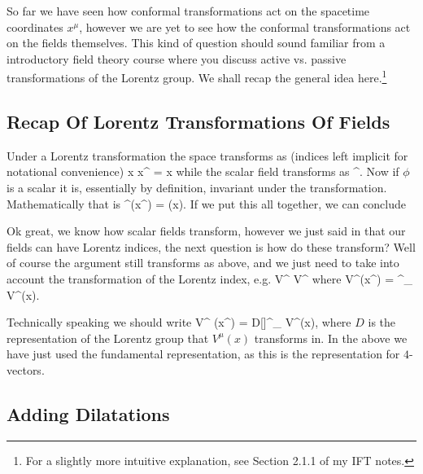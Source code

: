 So far we have seen how conformal transformations act on the spacetime coordinates $x^{\mu}$, however we are yet to see how the conformal transformations act on the fields themselves. This kind of question should sound familiar from a introductory field theory course where you discuss active vs. passive transformations of the Lorentz group. We shall recap the general idea here.\footnote{For a slightly more intuitive explanation, see Section 2.1.1 of my IFT notes.}

\subsection{Recap Of Lorentz Transformations Of Fields}

Under a Lorentz transformation the space transforms as (indices left implicit for notational convenience) 
\bse 
    x \to x^{\prime} = \Lambda x
\ese 
while the scalar field transforms as 
\bse 
    \phi \to \phi^{\prime}.
\ese 
Now if $\phi$ is a scalar it is, essentially by definition, invariant under the transformation. Mathematically that is
\bse 
    \phi^{\prime}(x^{\prime}) = \phi(x).
\ese 
If we put this all together, we can conclude

Ok great, we know how scalar fields transform, however we just said in  that our fields can have Lorentz indices, the next question is how do these transform? Well of course the argument still transforms as above, and we just need to take into account the transformation of the Lorentz index, e.g.
\bse 
    V^{\mu} \to V^{\prime\mu} 
\ese 
where 
\be 
\label{eqn:VmuTransform}
    V^{\prime\mu}(x^{\prime}) = {\Lambda^{\mu}}_{\nu} V^{\nu}(x).
\ee

\badr 
    Technically speaking we should write 
    \bse 
        V^{\prime \mu} (x^{\prime}) = {D[\Lambda]^{\mu}}_{\nu} V^{\nu}(x),
    \ese
    where $D$ is the representation of the Lorentz group that $V^{\mu}(x)$ transforms in. In the above we have just used the fundamental representation, as this is the representation for $4$-vectors. 
\eadr 

\subsection{Adding Dilatations}

